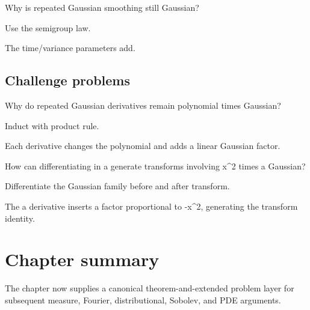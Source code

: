 \begin{exercise}\label{exr:iii12-expand-14}
Why is repeated Gaussian smoothing still Gaussian?
\end{exercise}
\begin{hint}
Use the semigroup law.
\end{hint}
\begin{solution}
The time/variance parameters add.
\end{solution}

\subsection*{Challenge problems}

\begin{exercise}\label{exr:iii12-expand-15}
Why do repeated Gaussian derivatives remain polynomial times Gaussian?
\end{exercise}
\begin{hint}
Induct with product rule.
\end{hint}
\begin{solution}
Each derivative changes the polynomial and adds a linear Gaussian factor.
\end{solution}

\begin{exercise}\label{exr:iii12-expand-16}
How can differentiating in a generate transforms involving x\textasciicircum{}2 times a Gaussian?
\end{exercise}
\begin{hint}
Differentiate the Gaussian family before and after transform.
\end{hint}
\begin{solution}
The a derivative inserts a factor proportional to -x\textasciicircum{}2, generating the transform identity.
\end{solution}
\section*{Chapter summary}
The chapter now supplies a canonical theorem-and-extended problem layer for subsequent measure, Fourier, distributional, Sobolev, and PDE arguments.
